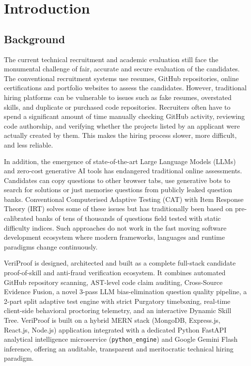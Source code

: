 
\chapter{Introduction}
\section{Background}
The current technical recruitment and academic evaluation still face the monumental challenge of fair, accurate and secure evaluation of the candidates. The conventional recruitment systems use resumes, GitHub repositories, online certifications and portfolio websites to assess the candidates. However, traditional hiring platforms can be vulnerable to issues such as fake resumes, overstated skills, and duplicate or purchased code repositories. Recruiters often have to spend a significant amount of time manually checking GitHub activity, reviewing code authorship, and verifying whether the projects listed by an applicant were actually created by them. This makes the hiring process slower, more difficult, and less reliable.

In addition, the emergence of state-of-the-art Large Language Models (LLMs) and zero-cost generative AI tools has endangered traditional online assessments. Candidates can copy questions to other browser tabs, use generative bots to search for solutions or just memorise questions from publicly leaked question banks. Conventional Computerised Adaptive Testing (CAT) with Item Response Theory (IRT) solves some of these issues but has traditionally been based on pre-calibrated banks of tens of thousands of questions field tested with static difficulty indices. Such approaches do not work in the fast moving software development ecosystem where modern frameworks, languages and runtime paradigms change continuously.

VeriProof is designed, architected and built as a complete full-stack candidate proof-of-skill and anti-fraud verification ecosystem. It combines automated GitHub repository scanning, AST-level code claim auditing, Cross-Source Evidence Fusion, a novel 3-pass LLM bias-elimination question quality pipeline, a 2-part split adaptive test engine with strict Purgatory timeboxing, real-time client-side behavioral proctoring telemetry, and an interactive Dynamic Skill Tree. VeriProof is built on a hybrid MERN stack (MongoDB, Express.js, React.js, Node.js) application integrated with a dedicated Python FastAPI analytical intelligence microservice (\texttt{python\_engine}) and Google Gemini Flash inference, offering an auditable, transparent and meritocratic technical hiring paradigm.

